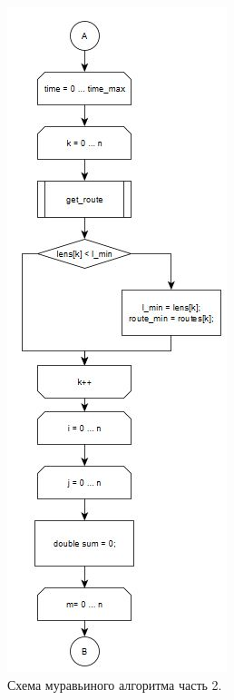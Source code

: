 \documentclass[a4paper,oneside,14pt]{extreport}
\begin{document}
\begin{figure}[H]
	\begin{center}
		\includegraphics[scale=1]{images/formic2.png}
		\caption{Схема муравьиного алгоритма часть 2.}
		\label{fig:formic2}
	\end{center}
\end{figure}
\end{document}
